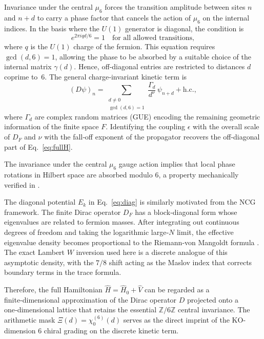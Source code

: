 \documentclass[11pt,a4paper]{article}
\begin{document}
Invariance under the central $\mu_6$ forces the transition amplitude between sites $n$ and $n+d$ to carry a phase factor that cancels the action of $\mu_6$ on the internal indices. In the basis where the $U(1)$ generator is diagonal, the condition is
\begin{equation}
e^{2\pi i q d /6} = 1 \quad \text{for all allowed transitions},
\end{equation}
where $q$ is the $U(1)$ charge of the fermion. This equation requires $\gcd(d,6)=1$, allowing the phase to be absorbed by a suitable choice of the internal matrix $\gamma(d)$. Hence, off‑diagonal entries are restricted to distances $d$ coprime to~6. The general charge‑invariant kinetic term is
\begin{equation}
(D\psi)_n = \sum_{\substack{d\neq 0 \\ \gcd(d,6)=1}} \frac{\Gamma_d}{d^{\nu}} \, \psi_{n+d} + \text{h.c.},
\end{equation}
where $\Gamma_d$ are complex random matrices (GUE) encoding the remaining geometric information of the finite space $F$. Identifying the coupling $\epsilon$ with the overall scale of $D_F$ and $\nu$ with the fall‑off exponent of the propagator recovers the off‑diagonal part of Eq.~\eqref{eq:fullH}.

The invariance under the central $\mu_6$ gauge action implies that local phase rotations in 
Hilbert space are absorbed modulo 6, a property mechanically verified in .

The diagonal potential $E_k$ in Eq.~\eqref{eq:diag} is similarly motivated from the NCG framework. The finite Dirac operator $D_F$ has a block‑diagonal form whose eigenvalues are related to fermion masses. After integrating out continuous degrees of freedom and taking the logarithmic large‑$N$ limit, the effective eigenvalue density becomes proportional to the Riemann‑von Mangoldt formula \cite{Connes1999}. The exact Lambert $W$ inversion used here is a discrete analogue of this asymptotic density, with the $7/8$ shift acting as the Maslov index that corrects boundary terms in the trace formula.

Therefore, the full Hamiltonian $\hat H = \hat H_0 + \hat V$ can be regarded as a finite‑dimensional approximation of the Dirac operator $D$ projected onto a one‑dimensional lattice that retains the essential $\mathbb{Z}/6\mathbb{Z}$ central invariance. The arithmetic mask $\Xi(d)=\chi_0^{(6)}(d)$ serves as the direct imprint of the KO-dimension 6 chiral grading on the discrete kinetic term. 
\end{document}
